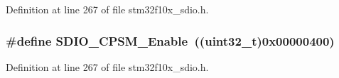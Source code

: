 Definition at line 267 of file stm32f10x\+\_\+sdio.\+h.

\subsubsection[{\texorpdfstring{S\+D\+I\+O\+\_\+\+C\+P\+S\+M\+\_\+\+Enable}{SDIO_CPSM_Enable}}]{\setlength{\rightskip}{0pt plus 5cm}\#define S\+D\+I\+O\+\_\+\+C\+P\+S\+M\+\_\+\+Enable~(({\bf uint32\+\_\+t})0x00000400)}\hypertarget{group___s_d_i_o___c_p_s_m___state_gad437cefe89d6175aa074a1c40b909ebc}{}\label{group___s_d_i_o___c_p_s_m___state_gad437cefe89d6175aa074a1c40b909ebc}


Definition at line 267 of file stm32f10x\+\_\+sdio.\+h.

